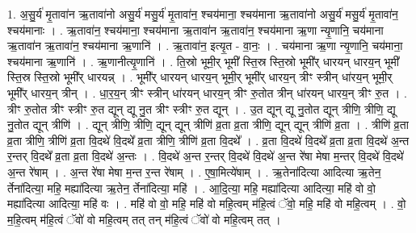 \documentclass[17pt]{extarticle}
\begin{document}
1. अ॒सु॒र्य॑ मृ॒तावा॑न ऋ॒तावा॑नो असु॒र्य॑ मसु॒र्य॑ मृ॒तावा॑न॒ श्चय॑माना॒ श्चय॑माना ऋ॒तावा॑नो असु॒र्य॑ मसु॒र्य॑ मृ॒तावा॑न॒ श्चय॑मानाः । . ऋ॒तावा॑न॒ श्चय॑माना॒ श्चय॑माना ऋ॒तावा॑न ऋ॒तावा॑न॒ श्चय॑माना ऋ॒णा न्यृ॒णानि॒ चय॑माना ऋ॒तावा॑न ऋ॒तावा॑न॒ श्चय॑माना ऋ॒णानि॑ । . ऋ॒तावा॑न॒ इत्यृ॒त - वा॒नः॒ । . चय॑माना ऋ॒णा न्यृ॒णानि॒ चय॑माना॒ श्चय॑माना ऋ॒णानि॑ । . ऋ॒णानीत्यृ॒णानि॑ । . ति॒स्रो भूमी॒र् भूमी᳚ स्ति॒स्र स्ति॒स्रो भूमी᳚र् धारयन् धारय॒न् भूमी᳚ स्ति॒स्र स्ति॒स्रो भूमी᳚र् धारयन्न् । . भूमी᳚र् धारयन् धारय॒न् भूमी॒र् भूमी᳚र् धारय॒न् त्रीꣳ स्त्रीन् धा॑रय॒न् भूमी॒र् भूमी᳚र् धारय॒न् त्रीन् । . धा॒र॒य॒न् त्रीꣳ स्त्रीन् धा॑रयन् धारय॒न् त्रीꣳ रु॒तोत त्रीन् धा॑रयन् धारय॒न् त्रीꣳ रु॒त । . त्रीꣳ रु॒तोत त्रीꣳ स्त्रीꣳ रु॒त द्यून् द्यू नु॒त त्रीꣳ स्त्रीꣳ रु॒त द्यून् । . उ॒त द्यून् द्यू नु॒तोत द्यून् त्रीणि॒ त्रीणि॒ द्यू नु॒तोत द्यून् त्रीणि॑ । . द्यून् त्रीणि॒ त्रीणि॒ द्यून् द्यून् त्रीणि॑ व्र॒ता व्र॒ता त्रीणि॒ द्यून् द्यून् त्रीणि॑ व्र॒ता । . त्रीणि॑ व्र॒ता व्र॒ता त्रीणि॒ त्रीणि॑ व्र॒ता वि॒दथे॑ वि॒दथे᳚ व्र॒ता त्रीणि॒ त्रीणि॑ व्र॒ता वि॒दथे᳚ । . व्र॒ता वि॒दथे॑ वि॒दथे᳚ व्र॒ता व्र॒ता वि॒दथे॑ अ॒न्त र॒न्तर् वि॒दथे᳚ व्र॒ता व्र॒ता वि॒दथे॑ अ॒न्तः । . वि॒दथे॑ अ॒न्त र॒न्तर् वि॒दथे॑ वि॒दथे॑ अ॒न्त रे॑षा मेषा म॒न्तर् वि॒दथे॑ वि॒दथे॑ अ॒न्त रे॑षाम् । . अ॒न्त रे॑षा मेषा म॒न्त र॒न्त रे॑षाम् । . ए॒षा॒मित्ये॑षाम् । . ऋ॒तेना॑दित्या आदित्या ऋ॒तेन॒ र्तेना॑दित्या॒ महि॒ मह्या॑दित्या ऋ॒तेन॒ र्तेना॑दित्या॒ महि॑ । . आ॒दि॒त्या॒ महि॒ मह्या॑दित्या आदित्या॒ महि॑ वो वो॒ मह्या॑दित्या आदित्या॒ महि॑ वः । . महि॑ वो वो॒ महि॒ महि॑ वो महि॒त्वम् म॑हि॒त्वं ॅवो॒ महि॒ महि॑ वो महि॒त्वम् । . वो॒ म॒हि॒त्वम् म॑हि॒त्वं ॅवो॑ वो महि॒त्वम् तत् तन् म॑हि॒त्वं ॅवो॑ वो महि॒त्वम् तत् । \newline
\end{document}
